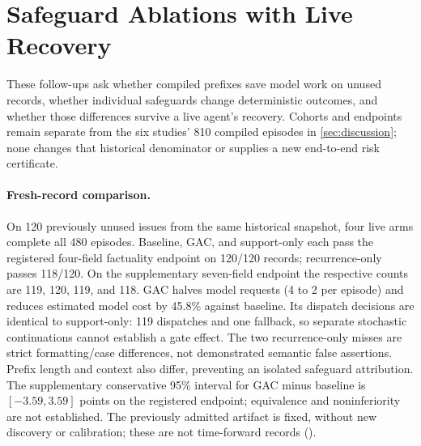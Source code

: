 \section{Safeguard Ablations with Live Recovery}
\label{app:live-recovery}

These follow-ups ask whether compiled prefixes save model work on unused
records, whether individual safeguards change deterministic outcomes, and
whether those differences survive a live agent's recovery. Cohorts and endpoints
remain separate from the six studies' 810 compiled episodes in
\cref{sec:discussion}; none changes that historical denominator or supplies a
new end-to-end risk certificate.

\paragraph{Fresh-record comparison.}
On 120 previously unused issues from the same historical snapshot, four live
arms complete all 480 episodes. Baseline, GAC, and support-only each pass the
registered four-field factuality endpoint on 120/120 records; recurrence-only
passes 118/120. On the supplementary seven-field endpoint the respective counts
are 119, 120, 119, and 118. GAC halves model requests (4 to 2 per episode) and
reduces estimated model cost by 45.8\% against baseline. Its dispatch decisions
are identical to support-only: 119 dispatches and one fallback, so separate
stochastic continuations cannot establish a gate effect. The two recurrence-only
misses are strict formatting/case differences, not demonstrated semantic false
assertions. Prefix length and context also differ, preventing an isolated
safeguard attribution. The supplementary conservative 95\% interval for GAC
minus baseline is $[-3.59,3.59]$ points on the registered endpoint; equivalence
and noninferiority are not established. The previously admitted artifact is
fixed, without new discovery or calibration; these are not time-forward
records ().

